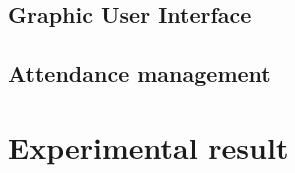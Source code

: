 \documentclass[journal, twocolumn]{IEEEtran}
\begin{document}
\subsection{Graphic User Interface}
\label{gui}

\subsection{Attendance management}
\label{attendance-management}


\medskip
\section{Experimental result}
\label{experimental-result}


\begin{thebibliography}{9}

\end{thebibliography}
\end{document}
